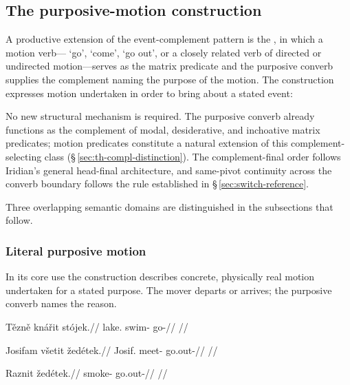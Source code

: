 \subsection{The purposive-motion construction}\label{sec:purp-motion}

A productive extension of the event-complement pattern is the
, in which a motion verb--- `go',
 `come',  `go out', or a closely related verb of directed
or undirected motion---serves as the matrix predicate and the purposive converb
supplies the complement naming the purpose of the motion. The construction
expresses motion undertaken in order to bring about a stated event:

\begin{center}
\end{center}

\noindent No new structural mechanism is required. The purposive converb already
functions as the complement of modal, desiderative, and inchoative matrix
predicates; motion predicates constitute a natural extension of this
complement-selecting class (§\,\ref{sec:th-compl-distinction}). The
complement-final order follows Iridian's general head-final architecture, and
same-pivot continuity across the converb boundary follows the rule established
in §\,\ref{sec:switch-reference}.

Three overlapping semantic domains are distinguished in the subsections that
follow.

\subsubsection{Literal purposive motion}\label{sec:purp-motion-literal}

In its core use the construction describes concrete, physically real motion
undertaken for a stated purpose. The mover departs or arrives; the purposive
converb names the reason.

\ex\label{ex:purp-swim}%
\begingl
\gla Tězně knářit stójek.//
\glb lake.\Ind{} swim-\Purp{} go-\Pf{}//
\glft {}//
\endgl
\xe

\ex\label{ex:purp-meet}%
\begingl
\gla Josifam všetit žedétek.//
\glb Josif.\Ind{} meet-\Purp{} go.out-\Pf{}//
\glft {}//
\endgl
\xe

\ex\label{ex:purp-smoke}%
\begingl
\gla Raznit žedétek.//
\glb smoke-\Purp{} go.out-\Pf{}//
\glft {}//
\endgl
\xe

